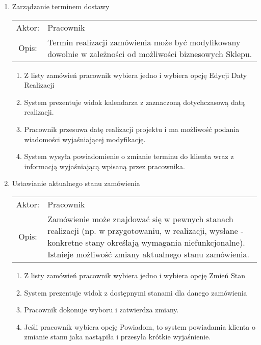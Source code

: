 \begin{enumerate}
  \item Zarządzanie terminem dostawy\\
  \begin{tabularx}{\linewidth}{c X}
  Aktor: & Pracownik \\
  Opis: & Termin realizacji zamówienia może być modyfikowany dowolnie w
  zależności od możliwości biznesowych Sklepu.
  \end{tabularx}
	\begin{enumerate}
	  \item Z listy zamówień pracownik wybiera jedno i wybiera opcję Edycji Daty
	  Realizacji
	  \item System prezentuje widok kalendarza z zaznaczoną dotychczasową datą
	  realizacji.
	  \item Pracownik przesuwa datę realizacji projektu i ma możliwość podania
	  wiadomości wyjaśniającej modyfikację.
	  \item System wysyła powiadomienie o zmianie terminu do klienta wraz z
	  informacją wyjaśniającą wpisaną przez pracownika.
	\end{enumerate}

  \item Ustawianie aktualnego stanu zamówienia\\
  \begin{tabularx}{\linewidth}{c X}
  Aktor: & Pracownik \\
  Opis: & Zamówienie może znajdować się w pewnych stanach realizacji (np. w
  przygotowaniu, w realizacji, wysłane - konkretne stany określają wymagania
  niefunkcjonalne). Istnieje możliwość zmiany aktualnego stanu zamówienia.
  \end{tabularx}
	\begin{enumerate}
	  \item Z listy zamówień pracownik wybiera jedno i wybiera opcję Zmień Stan
	  \item System prezentuje widok z dostępnymi stanami dla danego zamówienia
	  \item Pracownik dokonuje wyboru i zatwierdza zmiany.
	  \item Jeśli pracownik wybiera opcję Powiadom, to system powiadamia klienta o
	  zmianie stanu jaka nastąpiła i przesyła krótkie wyjaśnienie.
	\end{enumerate}
	 
\end{enumerate}
